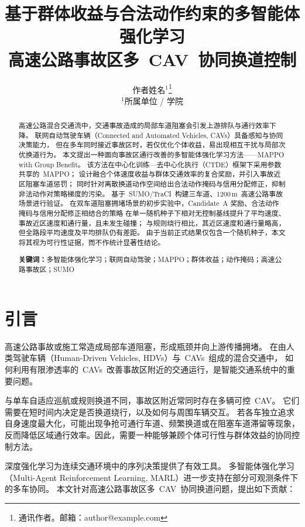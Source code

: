 \documentclass[UTF8,a4paper,11pt]{ctexart}
\title{\textbf{基于群体收益与合法动作约束的多智能体强化学习\\高速公路事故区多~CAV~协同换道控制}}
\author{
  作者姓名$^{1}$\thanks{通讯作者。邮箱：author@example.com}\\
  \small $^{1}$所属单位 / 学院
}
\date{}
\begin{document}
\maketitle

\begin{abstract}
高速公路混合交通流中，交通事故造成的局部车道阻塞会引发上游排队与通行效率下降。
联网自动驾驶车辆（Connected and Automated Vehicles, CAVs）具备感知与协同决策能力，
但在多车同时接近事故区时，若仅优化个体收益，易出现相互干扰与局部次优换道行为。
本文提出一种面向事故区通行改善的多智能体强化学习方法——MAPPO with Group Benefit。
该方法在中心化训练—去中心化执行（CTDE）框架下采用参数共享的~MAPPO；
设计融合个体速度收益与群体交通效率的复合奖励，并引入事故近区阻塞车道惩罚；
同时针对离散换道动作空间给出合法动作掩码与信用分配修正，抑制非法动作对策略梯度的污染。
基于~SUMO/TraCI~构建三车道、1200\,m~高速公路事故场景进行验证。
在双车道阻塞拥堵场景的初步实验中，Candidate~A 奖励、合法动作掩码与信用分配修正相结合的策略
在单一随机种子下相对无控制基线提升了平均速度、事故近区速度和通行量，且未发生碰撞；
与规则绕行相比，其近区速度和通行量略高，但全路段平均速度及平均排队仍有差距。
由于当前正式结果仅包含一个随机种子，本文将其视为可行性证据，而不作统计显著性结论。

\vspace{0.5em}
\noindent\textbf{关键词：}多智能体强化学习；联网自动驾驶；MAPPO；群体收益；动作掩码；高速公路事故区；SUMO
\end{abstract}

\section{引言}

高速公路事故或施工常造成局部车道阻塞，形成瓶颈并向上游传播拥堵\cite{singh2023roadworks}。
在由人类驾驶车辆（Human-Driven Vehicles, HDVs）与~CAVs~组成的混合交通中，
如何利用有限渗透率的~CAVs~改善事故区附近的交通运行，是智能交通系统中的重要问题\cite{di2021survey,chen2023merging}。

与单车自适应巡航或规则换道不同，事故区附近常同时存在多辆可控~CAV。
它们需要在短时间内决定是否换道绕行，以及如何与周围车辆交互。
若各车独立追求自身速度最大化，可能出现争抢可通行车道、频繁换道或在阻塞车道滞留等现象，
反而降低区域通行效率\cite{zhou2022marl,bi2024mqlc}。因此，需要一种能够兼顾个体可行性与群体效益的协同控制方法。

深度强化学习为连续交通环境中的序列决策提供了有效工具\cite{wu2022flow}。
多智能体强化学习（Multi-Agent Reinforcement Learning, MARL）进一步支持在部分可观测条件下的多车协同\cite{yu2022mappo,guo2024mappopis}。
本文针对高速公路事故区多~CAV~协同换道问题，提出如下贡献：
\end{document}
